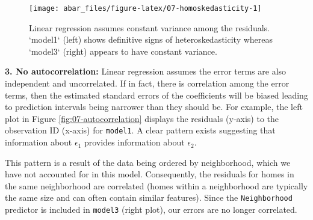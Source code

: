 \documentclass[]{book}
\theoremstyle{definition}
\theoremstyle{definition}
\theoremstyle{definition}
\theoremstyle{remark}
\begin{document}
\begin{figure}

{\centering \texttt{[image: abar\_files/figure-latex/07-homoskedasticity-1]} 

}

\caption{Linear regression assumes constant variance among the residuals. `model1` (left) shows definitive signs of heteroskedasticity whereas `model3` (right) appears to have constant variance.}\label{fig:07-homoskedasticity}
\end{figure}

\textbf{3. No autocorrelation:} Linear regression assumes the error
terms are also independent and uncorrelated. If in fact, there is
correlation among the error terms, then the estimated standard errors of
the coefficients will be biased leading to prediction intervals being
narrower than they should be. For example, the left plot in Figure
\ref{fig:07-autocorrelation} displays the residuals (y-axis) to the
observation ID (x-axis) for \texttt{model1}. A clear pattern exists
suggesting that information about \(\epsilon_1\) provides information
about \(\epsilon_2\).

This pattern is a result of the data being ordered by neighborhood,
which we have not accounted for in this model. Consequently, the
residuals for homes in the same neighborhood are correlated (homes
within a neighborhood are typically the same size and can often contain
similar features). Since the \texttt{Neighborhood} predictor is included
in \texttt{model3} (right plot), our errors are no longer correlated.
\end{document}
